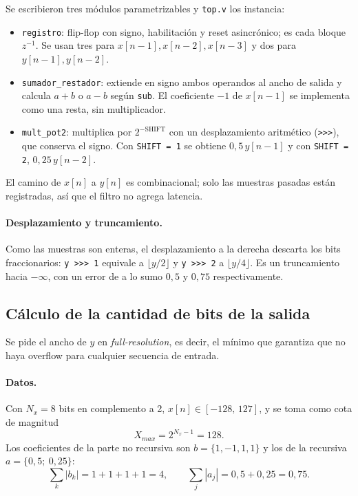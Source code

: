\documentclass[11pt,a4paper]{scrartcl}
\newcommand{\sig}[1]{\texttt{#1}}
\begin{document}
	Se escribieron tres módulos parametrizables y \sig{top.v} los instancia:

	\begin{itemize}
		\item \sig{registro}: flip-flop con signo, habilitación y reset asincrónico; es
		cada bloque $z^{-1}$. Se usan tres para $x[n-1], x[n-2], x[n-3]$ y dos para
		$y[n-1], y[n-2]$.
		\item \sig{sumador\_restador}: extiende en signo ambos operandos al ancho de salida
		y calcula $a+b$ o $a-b$ según \sig{sub}. El coeficiente $-1$ de $x[n-1]$ se
		implementa como una resta, sin multiplicador.
		\item \sig{mult\_pot2}: multiplica por $2^{-\text{SHIFT}}$ con un desplazamiento
		aritmético (\sig{>>>}), que conserva el signo. Con \sig{SHIFT = 1} se obtiene
		$0{,}5\,y[n-1]$ y con \sig{SHIFT = 2}, $0{,}25\,y[n-2]$.
	\end{itemize}

	El camino de $x[n]$ a $y[n]$ es combinacional; solo las muestras pasadas están
	registradas, así que el filtro no agrega latencia.

	\paragraph{Desplazamiento y truncamiento.} Como las muestras son enteras, el
	desplazamiento a la derecha descarta los bits fraccionarios: \sig{y >>> 1} equivale a
	$\lfloor y/2 \rfloor$ y \sig{y >>> 2} a $\lfloor y/4 \rfloor$. Es un truncamiento hacia
	$-\infty$, con un error de a lo sumo $0{,}5$ y $0{,}75$ respectivamente.

	\subsection{Cálculo de la cantidad de bits de la salida}

	Se pide el ancho de $y$ en \emph{full-resolution}, es decir, el mínimo que garantiza
	que no haya overflow para cualquier secuencia de entrada.

	\paragraph{Datos.} Con $N_x = 8$ bits en complemento a 2, $x[n] \in [-128,\,127]$, y se
	toma como cota de magnitud
	\[
		X_{max} = 2^{N_x-1} = 128 .
	\]
	Los coeficientes de la parte no recursiva son $b = \{1, -1, 1, 1\}$ y los de la
	recursiva $a = \{0{,}5;\ 0{,}25\}$:
	\[
		\sum_k |b_k| = 1+1+1+1 = 4, \qquad \sum_j |a_j| = 0{,}5 + 0{,}25 = 0{,}75 .
	\]
\end{document}
